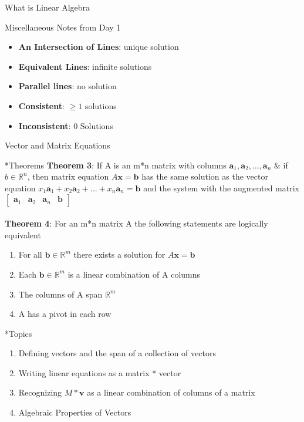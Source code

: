 \documentclass[a4paper, 12pt]{article}
\begin{document}
\begin{section}{What is Linear Algebra}
\begin{subsection}{Miscellaneous Notes from Day 1}
	\begin{itemize}
		\item{\textbf{An Intersection of Lines}:
			unique solution}
		\item{\textbf{Equivalent Lines}:
			infinite solutions}
		\item{\textbf{Parallel lines}: no solution}
		\item{\textbf{Consistent}: $\geq 1$ solutions}
		\item{\textbf{Inconsistent}: 0 Solutions}
	\end{itemize}
\end{subsection}

\end{section}	

\begin{section}{Vector and Matrix Equations}

\begin{subsection}*{Theorems}
\textbf{Theorem 3}: If A is an m*n matrix with columns
$\textbf{a}_1, \textbf{a}_2,\dots,\textbf{a}_n$ & if 
$b \in \mathbb{R}^n$, then matrix equation $A\textbf{x}=\textbf{b}$
has the same solution as the vector equation
$x_1\textbf{a}_1+x_2\textbf{a}_2+\dots+x_n\textbf{a}_n=\textbf{b}$
and the system with the augmented matrix 
$\begin{bmatrix} 
\textbf{a}_1 & \textbf{a}_2 & \textbf{a}_n & \textbf{b} \end{bmatrix}$ 
\\ \\
\textbf{Theorem 4}: For an m*n matrix A the following statements
are logically equivalent
\begin{enumerate}
	\item{For all $\textbf{b}\in\mathbb{R}^m$ 
	there exists a solution for $A\textbf{x}=\textbf{b}$}
	\item{Each $\textbf{b}\in\mathbb{R}^m$ is a linear combination
		of A columns}
	\item{The columns of A span $\mathbb{R}^m$}
	\item{A has a pivot in each row}
\end{enumerate}
\end{subsection}
\begin{subsection}*{Topics}
\begin{enumerate}
	\item{Defining vectors and the span of a collection of vectors}
	\item{Writing linear equations as a matrix * vector}
	\item{Recognizing $M*\textbf{v}$ as a linear combination
		of columns of a matrix}
	\item{Algebraic Properties of Vectors}
\end{enumerate}
\end{subsection}


\end{section}
\end{document}
